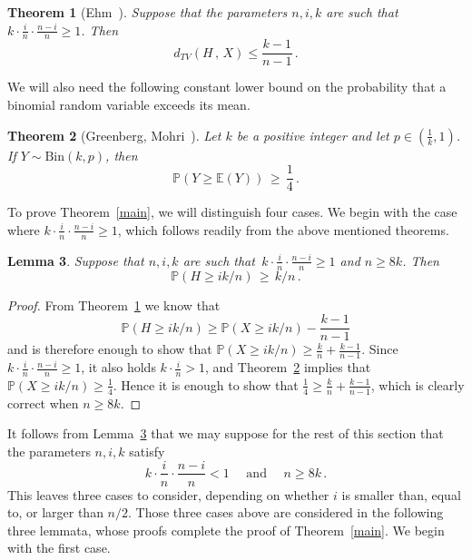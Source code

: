 \documentclass[10pt]{article}
\theoremstyle{plain}
\newtheorem{theorem}{Theorem}[section]
\newtheorem{lemma}[theorem]{Lemma}
\theoremstyle{definition}
\theoremstyle{remark}
\newcommand{\Exp}{\mathbb{E}}
\begin{document}
\begin{theorem}[Ehm~\cite{Ehm}]
\label{Ehm}
    Suppose that the parameters $n,i,k$ are such that\, $k\cdot\frac{i}{n}\cdot \frac{n-i}{n}\ge 1$. Then 
    \[
    d_{TV}(H \, , \, X) \le \frac{k-1}{n-1} \, . 
    \]
\end{theorem}
\noindent
We will also need the following constant lower bound on the probability that a binomial random variable exceeds its mean. 

\begin{theorem}[Greenberg, Mohri~\cite{greenberg2014tight}]
\label{Greenberg_Mohri}
Let $k$ be a positive integer and let $p\in (\frac{1}{k},1)$. If  $Y\sim\text{Bin}(k,p)$, then 
\[
\mathbb{P}(Y \ge \Exp(Y)) \, \ge \, \frac{1}{4} \, .
\]
\end{theorem}
 

To prove Theorem~\ref{main}, we will distinguish four cases. 
We begin with the case where $k\cdot\frac{i}{n}\cdot \frac{n-i}{n}\ge 1$, which follows readily  from the above mentioned theorems. 



\begin{lemma}\label{prop_main}
Suppose that $n,i,k$ are such that\, $k\cdot\frac{i}{n}\cdot \frac{n-i}{n}\ge 1$ and $n\ge 8k$. 
Then 
\[
\mathbb{P}(H \ge ik/n) \,\ge\, k/n \, .
\]
\end{lemma}
\begin{proof}
From Theorem~\ref{Ehm} we know that 
\[
\mathbb{P}(H \ge ik/n) \ge \mathbb{P}(X \ge ik/n) - \frac{k-1}{n-1}
\]
and is therefore enough to show that 
$\mathbb{P}(X \ge ik/n)  \ge \frac{k}{n} + \frac{k-1}{n-1}$. 
Since $k\cdot\frac{i}{n}\cdot \frac{n-i}{n}\ge 1$,  it also holds 
$k\cdot\frac{i}{n}> 1$, and 
Theorem~\ref{Greenberg_Mohri} implies that 
$\mathbb{P}(X \ge ik/n) \ge \frac{1}{4}$.
Hence  it is enough to show that 
$\frac{1}{4} \ge \frac{k}{n} + \frac{k-1}{n-1}$, 
which is clearly correct when $n\ge 8k$. 
\end{proof}

It follows from Lemma~\ref{prop_main} that we may suppose for the rest of this section that the parameters $n,i,k$ satisfy 
\begin{equation}\label{main_assumption1}
k\cdot\frac{i}{n}\cdot \frac{n-i}{n}< 1 \quad \text{ and } \quad n\ge 8k \, .
\end{equation}
This leaves three cases to consider, depending on whether $i$ is smaller than, equal to, or larger than $n/2$. 
Those three cases above are considered in the following three lemmata, whose proofs complete the proof of Theorem~\ref{main}. 
We begin with the first case. 
\end{document}
